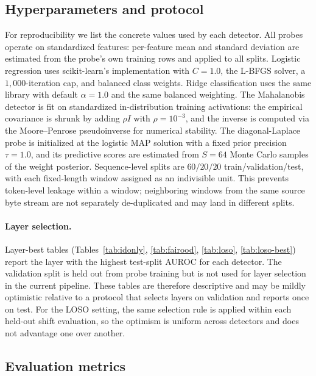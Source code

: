 \documentclass[11pt]{article}
\begin{document}
\subsection{Hyperparameters and protocol}\label{sec:hyperparameters}

For reproducibility we list the concrete values used by each detector. All probes operate on standardized features: per-feature mean and standard deviation are estimated from the probe's own training rows and applied to all splits. Logistic regression uses scikit-learn's implementation with $C=1.0$, the L-BFGS solver, a $1{,}000$-iteration cap, and balanced class weights. Ridge classification uses the same library with default $\alpha=1.0$ and the same balanced weighting. The Mahalanobis detector is fit on standardized in-distribution training activations: the empirical covariance is shrunk by adding $\rho I$ with $\rho=10^{-3}$, and the inverse is computed via the Moore--Penrose pseudoinverse for numerical stability. The diagonal-Laplace probe is initialized at the logistic MAP solution with a fixed prior precision $\tau=1.0$, and its predictive scores are estimated from $S=64$ Monte Carlo samples of the weight posterior. Sequence-level splits are $60/20/20$ train/validation/test, with each fixed-length window assigned as an indivisible unit. This prevents token-level leakage within a window; neighboring windows from the same source byte stream are not separately de-duplicated and may land in different splits.

\paragraph{Layer selection.} Layer-best tables (Tables~\ref{tab:idonly}, \ref{tab:fairood}, \ref{tab:loso}, \ref{tab:loso-best}) report the layer with the highest test-split AUROC for each detector. The validation split is held out from probe training but is not used for layer selection in the current pipeline. These tables are therefore descriptive and may be mildly optimistic relative to a protocol that selects layers on validation and reports once on test. For the LOSO setting, the same selection rule is applied within each held-out shift evaluation, so the optimism is uniform across detectors and does not advantage one over another.

\subsection{Evaluation metrics}
\end{document}
